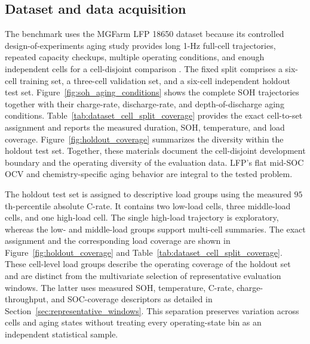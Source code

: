 \documentclass[review,nopreprintline]{elsarticle}
\begin{document}
\subsection{Dataset and data acquisition}
The benchmark uses the MGFarm LFP 18650 dataset because its controlled design-of-experiments aging study provides long 1-Hz full-cell trajectories, repeated capacity checkups, multiple operating conditions, and enough independent cells for a cell-disjoint comparison \cite{aqachtoulMGFARMIoTEdgeDriven2026,LFP_DoE_Cycle_Aging_Dataset,siebertzStatistischeVersuchsplanung2017}. The fixed split comprises a six-cell training set, a three-cell validation set, and a six-cell independent holdout test set. Figure~\ref{fig:soh_aging_conditions} shows the complete SOH trajectories together with their charge-rate, discharge-rate, and depth-of-discharge aging conditions. Table~\ref{tab:dataset_cell_split_coverage} provides the exact cell-to-set assignment and reports the measured duration, SOH, temperature, and load coverage. Figure~\ref{fig:holdout_coverage} summarizes the diversity within the holdout test set. Together, these materials document the cell-disjoint development boundary and the operating diversity of the evaluation data. LFP's flat mid-SOC OCV and chemistry-specific aging behavior are integral to the tested problem.

The holdout test set is assigned to descriptive load groups using the measured $95$th-percentile absolute C-rate. It contains two low-load cells, three middle-load cells, and one high-load cell. The single high-load trajectory is exploratory, whereas the low- and middle-load groups support multi-cell summaries. The exact assignment and the corresponding load coverage are shown in Figure~\ref{fig:holdout_coverage} and Table~\ref{tab:dataset_cell_split_coverage}. These cell-level load groups describe the operating coverage of the holdout set and are distinct from the multivariate selection of representative evaluation windows. The latter uses measured SOH, temperature, C-rate, charge-throughput, and SOC-coverage descriptors as detailed in Section~\ref{sec:representative_windows}. This separation preserves variation across cells and aging states without treating every operating-state bin as an independent statistical sample.
\end{document}
